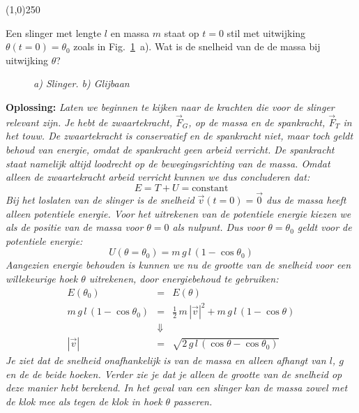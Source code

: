 \begin{center}
\line(1,0){250}
\end{center}
\begin{voorbeeld} 
Een slinger met lengte $l$ en massa $m$ staat op $t=0$ stil met uitwijking $\theta(t=0)=\theta_0$ zoals
in Fig.~\ref{fig:energiebehoud1}~a). Wat is de snelheid van de de massa bij uitwijking $\theta$?
 \begin{figure}[htbp]
\begin{center}
\caption{{\it a) Slinger. b) Glijbaan}}
\label{fig:energiebehoud1}
\end{center}
\end{figure} 

{\bf Oplossing: }{\it Laten we beginnen te kijken naar de krachten die voor de slinger relevant zijn. Je
hebt de zwaartekracht, $\vec{F}_G$, op de massa en de spankracht, $\vec{F}_T$ in het touw. De zwaartekracht
is conservatief en de spankracht niet, maar toch geldt behoud van energie, omdat de spankracht geen
arbeid verricht. De spankracht staat namelijk altijd loodrecht op de bewegingsrichting van de massa.
Omdat alleen de zwaartekracht arbeid verricht kunnen we dus concluderen dat:
\begin{equation}
E = T+U = \mbox{constant}
\end{equation}
Bij het loslaten van de slinger is de snelheid $\vec{v}(t=0)=\vec{0}$ dus de massa heeft alleen potentiele
energie. Voor het uitrekenen van de potentiele energie kiezen we als de positie van de massa
voor $\theta=0$ als nulpunt. Dus voor $\theta=\theta_0$ geldt voor de potentiele energie:
\begin{equation}
U(\theta=\theta_0) = m\,g\,l\,(1-\cos\theta_0)
\end{equation}
Aangezien energie behouden is kunnen we nu de grootte van de snelheid voor een willekeurige hoek 
$\theta$ uitrekenen, door energiebehoud te gebruiken:
\begin{eqnarray}
E(\theta_0) & = & E(\theta) \\
m\,g\,l\,(1-\cos\theta_0)  & = & \frac{1}{2}\,m\,|\vec{v}|^2 + m\,g\,l\,(1-\cos\theta)  \\
  & \Downarrow & \\
|\vec{v}| &= &\sqrt{2\,g\,l\,(\cos\theta-\cos\theta_0)}  
\end{eqnarray}
Je ziet dat de snelheid onafhankelijk is van de massa en alleen afhangt van $l$, $g$ en de de beide hoeken.
Verder zie je dat je alleen de grootte van de snelheid op deze manier hebt berekend. In het geval van een
slinger kan de massa zowel met de klok mee als tegen de klok in hoek $\theta$ passeren.
} 
\end{voorbeeld}

